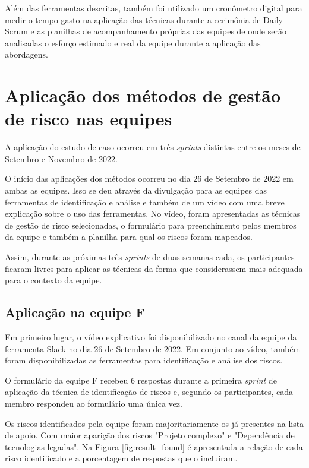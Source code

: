 \documentclass[
    12pt,       %
    openright,      %
    twoside,      %
    a4paper,      %
    english,      %
    french,       %
    spanish,      %
    brazil,       %
    ]{abntex2}
\begin{document}
Além das ferramentas descritas, também foi utilizado um cronômetro digital para medir o tempo gasto na aplicação das técnicas durante a cerimônia de Daily Scrum e as planilhas de acompanhamento próprias das equipes de onde serão analisadas o esforço estimado e real da equipe durante a aplicação das abordagens. 

\section{Aplicação dos métodos de gestão de risco nas equipes}

A aplicação do estudo de caso ocorreu em três \textit{sprints} distintas entre os meses de Setembro e Novembro de 2022.

O início das aplicações dos métodos ocorreu no dia 26 de Setembro de 2022 em ambas as equipes. Isso se deu através da divulgação para as equipes das ferramentas de identificação e análise e também de um vídeo com uma breve explicação sobre o uso das ferramentas. No vídeo, foram apresentadas as técnicas de gestão de risco selecionadas, o formulário para preenchimento pelos membros da equipe e também a planilha para qual os riscos foram mapeados.

Assim, durante as próximas três \textit{sprints} de duas semanas cada, os participantes ficaram livres para aplicar as técnicas da forma que considerassem mais adequada para o contexto da equipe. 

\subsection{Aplicação na equipe F}

Em primeiro lugar, o vídeo explicativo foi disponibilizado no canal da equipe da ferramenta Slack no dia 26 de Setembro de 2022. Em conjunto ao vídeo, também foram disponibilizadas as ferramentas para identificação e análise dos riscos. 

O formulário da equipe F recebeu 6 respostas durante a primeira \textit{sprint} de aplicação da técnica de identificação de riscos e, segundo os participantes, cada membro respondeu ao formulário uma única vez. 

Os riscos identificados pela equipe foram majoritariamente os já presentes na lista de apoio. Com maior aparição dos riscos "Projeto complexo" e "Dependência de tecnologias legadas". Na Figura \ref{fig:result_found} é apresentada a relação de cada risco identificado e a porcentagem de respostas que o incluíram.
\end{document}

